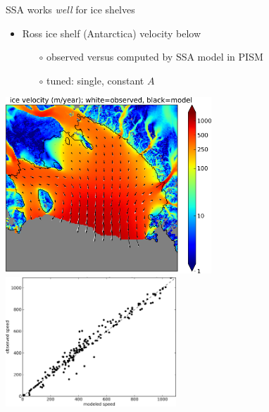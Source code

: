 \documentclass{beamer}
\begin{document}
\begin{frame}{SSA works \emph{well} for ice shelves}

\begin{itemize}
\item Ross ice shelf (Antarctica) velocity below
  \begin{itemize}
  \item[$\circ$] observed versus computed by SSA model in PISM
  \item[$\circ$] tuned: single, constant $A$
  \end{itemize}
\end{itemize}
\vspace{-0.3in}

\begin{center}
  \mbox{\includegraphics[width=0.58\textwidth]{rossquiver} \, \includegraphics[width=0.48\textwidth]{rossscatter}}
\end{center}
\end{frame}
\end{document}
